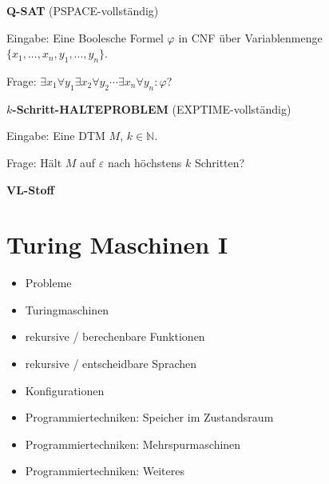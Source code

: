 \documentclass[a4paper,graphics,11pt]{article}
\newcommand{\eps}[0]{\varepsilon}
\begin{document}
\strut

\textbf{Q-SAT} (\textsf{PSPACE}-vollständig)

Eingabe: Eine Boolesche Formel $\varphi$ in CNF über Variablenmenge $\{x_1,...,x_n,y_1,...,y_n\}$.

Frage: $\exists x_1 \forall y_1 \exists x_2 \forall y_2 \cdots \exists x_n \forall y_n : \varphi$?

\strut

\textbf{$k$-Schritt-HALTEPROBLEM} (\textsf{EXPTIME}-vollständig)

Eingabe: Eine DTM $M$, $k \in \mathbb{N}$.

Frage: Hält $M$ auf $\eps$ nach höchstens $k$ Schritten?

\strut


\newpage

\begin{center}
    \LARGE \textbf{VL-Stoff}
\end{center}

\section{Turing Maschinen I}

\begin{itemize}
    \item Probleme
    \item Turingmaschinen
    \item rekursive / berechenbare Funktionen
    \item rekursive / entscheidbare Sprachen
    \item Konfigurationen
    \item Programmiertechniken: Speicher im Zustandsraum
    \item Programmiertechniken: Mehrspurmaschinen
    \item Programmiertechniken: Weiteres
\end{itemize}
\end{document}
